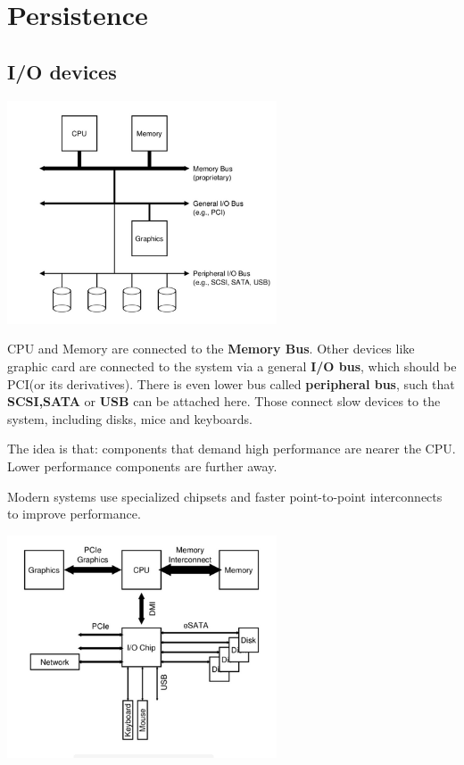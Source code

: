 \chapter{Persistence}

    \section{I/O devices}


    \includegraphics[width=0.6\textwidth]{chapters/Persistence/persistence/psa.png}

    CPU and Memory are connected to the \textbf{Memory Bus}. Other devices like graphic card 
    are connected to the system via a general \textbf{I/O bus}, which should 
    be PCI(or its derivatives). There is even lower bus called \textbf{peripheral bus}, such that 
    \textbf{SCSI,SATA} or \textbf{USB} can be attached here. Those connect slow devices to the 
    system, including disks, mice and keyboards.

    The idea is that: components that demand high performance are nearer the CPU. Lower 
    performance components are further away.



    Modern systems use specialized chipsets and faster point-to-point interconnects to 
    improve performance.

    \includegraphics[width=0.6\textwidth]{chapters/Persistence/persistence/msa.png}


